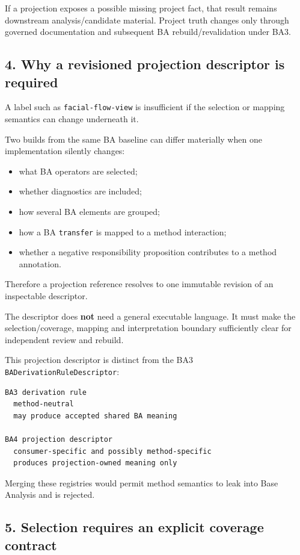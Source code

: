 \documentclass[11pt,a4paper]{article}
\providecommand{\tightlist}{\setlength{\itemsep}{0pt}\setlength{\parskip}{0pt}}
\begin{document}
If a projection exposes a possible missing project fact, that result remains downstream analysis/candidate material. Project truth changes only through governed documentation and subsequent BA rebuild/revalidation under BA3.

\subsection{4. Why a revisioned projection descriptor is required}\label{4-why-a-revisioned-projection-descriptor-is-required}

A label such as \texttt{facial-flow-view} is insufficient if the selection or mapping semantics can change underneath it.

Two builds from the same BA baseline can differ materially when one implementation silently changes:

\begin{itemize}
\tightlist
\item
  what BA operators are selected;
\item
  whether diagnostics are included;
\item
  how several BA elements are grouped;
\item
  how a BA \texttt{transfer} is mapped to a method interaction;
\item
  whether a negative responsibility proposition contributes to a method annotation.
\end{itemize}

Therefore a projection reference resolves to one immutable revision of an inspectable descriptor.

The descriptor does \textbf{not} need a general executable language. It must make the selection/coverage, mapping and interpretation boundary sufficiently clear for independent review and rebuild.

This projection descriptor is distinct from the BA3 \texttt{BADerivationRuleDescriptor}:

\begin{verbatim}
BA3 derivation rule
  method-neutral
  may produce accepted shared BA meaning

BA4 projection descriptor
  consumer-specific and possibly method-specific
  produces projection-owned meaning only
\end{verbatim}

Merging these registries would permit method semantics to leak into Base Analysis and is rejected.

\subsection{5. Selection requires an explicit coverage contract}\label{5-selection-requires-an-explicit-coverage-contract}
\end{document}
